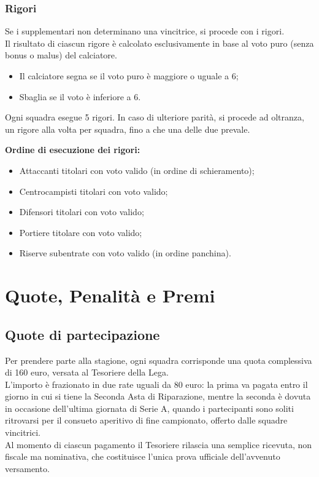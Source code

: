 \subsection{Rigori}
\label{art:9.5.2}

Se i supplementari non determinano una vincitrice, si procede con i rigori.\\
Il risultato di ciascun rigore è calcolato esclusivamente in base al voto puro (senza bonus o malus) del calciatore.

\begin{itemize}
\item Il calciatore segna se il voto puro è maggiore o uguale a 6;
\item Sbaglia se il voto è inferiore a 6.
\end{itemize}

Ogni squadra esegue 5 rigori. In caso di ulteriore parità, si procede ad oltranza, un rigore alla volta per squadra, fino a che una delle due prevale.

\noindent \textbf{Ordine di esecuzione dei rigori:}
\begin{itemize}
\item Attaccanti titolari con voto valido (in ordine di schieramento);
\item Centrocampisti titolari con voto valido;
\item Difensori titolari con voto valido;
\item Portiere titolare con voto valido;
\item Riserve subentrate con voto valido (in ordine panchina).
\end{itemize}


\chapter{Quote, Penalità e Premi}
\label{cap:quote-penalita-premi}

\section{Quote di partecipazione}
\label{art:10.1}

Per prendere parte alla stagione, ogni squadra corrisponde una quota complessiva di 160 euro, versata al Tesoriere della Lega.\\
L'importo è frazionato in due rate uguali da 80 euro: la prima va pagata entro il giorno in cui si tiene la Seconda Asta di Riparazione, mentre la seconda è dovuta in occasione dell'ultima giornata di Serie A, quando i partecipanti sono soliti ritrovarsi per il consueto aperitivo di fine campionato, offerto dalle squadre vincitrici.\\
Al momento di ciascun pagamento il Tesoriere rilascia una semplice ricevuta, non fiscale ma nominativa, che costituisce l'unica prova ufficiale dell'avvenuto versamento.

